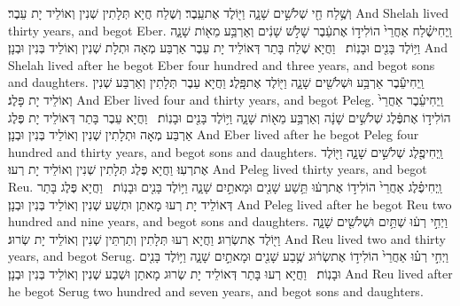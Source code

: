 {וְשֶׁ֥לַח חַ֖י שְׁלֹשִׁ֣ים שָׁנָ֑ה וַיּ֖וֹלֶד אֶת\maqqaf עֵֽבֶר׃}
{וְשֶׁלַח חֲיָא תְּלָתִין שְׁנִין וְאוֹלֵיד יָת עֵבֶר׃}
{And Shelah lived thirty years, and begot Eber.}{}
{וַֽיְחִי\maqqaf שֶׁ֗לַח אַחֲרֵי֙ הוֹלִיד֣וֹ אֶת\maqqaf עֵ֔בֶר שָׁלֹ֣שׁ שָׁנִ֔ים וְאַרְבַּ֥ע מֵא֖וֹת שָׁנָ֑ה וַיּ֥וֹלֶד בָּנִ֖ים וּבָנֽוֹת׃ \setuma }
{וַחֲיָא שֶׁלַח בָּתַר דְּאוֹלֵיד יָת עֵבֶר אַרְבַּע מְאָה וּתְלָת שְׁנִין וְאוֹלֵיד בְּנִין וּבְנָן׃}
{And Shelah lived after he begot Eber four hundred and three years, and begot sons and daughters.}{}
{וַֽיְחִי\maqqaf עֵ֕בֶר אַרְבַּ֥ע וּשְׁלֹשִׁ֖ים שָׁנָ֑ה וַיּ֖וֹלֶד אֶת\maqqaf פָּֽלֶג׃}
{וַחֲיָא עֵבֶר תְּלָתִין וְאַרְבַּע שְׁנִין וְאוֹלֵיד יָת פָּלֶג׃}
{And Eber lived four and thirty years, and begot Peleg.}{}
{וַֽיְחִי\maqqaf עֵ֗בֶר אַחֲרֵי֙ הוֹלִיד֣וֹ אֶת\maqqaf פֶּ֔לֶג שְׁלֹשִׁ֣ים שָׁנָ֔ה וְאַרְבַּ֥ע מֵא֖וֹת שָׁנָ֑ה וַיּ֥וֹלֶד בָּנִ֖ים וּבָנֽוֹת׃ \setuma }
{וַחֲיָא עֵבֶר בָּתַר דְּאוֹלֵיד יָת פֶּלֶג אַרְבַּע מְאָה וּתְלָתִין שְׁנִין וְאוֹלֵיד בְּנִין וּבְנָן׃}
{And Eber lived after he begot Peleg four hundred and thirty years, and begot sons and daughters.}{}
{וַֽיְחִי\maqqaf פֶ֖לֶג שְׁלֹשִׁ֣ים שָׁנָ֑ה וַיּ֖וֹלֶד אֶת\maqqaf רְעֽוּ׃}
{וַחֲיָא פֶּלֶג תְּלָתִין שְׁנִין וְאוֹלֵיד יָת רְעוּ׃}
{And Peleg lived thirty years, and begot Reu.}{}
{וַֽיְחִי\maqqaf פֶ֗לֶג אַחֲרֵי֙ הוֹלִיד֣וֹ אֶת\maqqaf רְע֔וּ תֵּ֥שַׁע שָׁנִ֖ים וּמָאתַ֣יִם שָׁנָ֑ה וַיּ֥וֹלֶד בָּנִ֖ים וּבָנֽוֹת׃ \setuma }
{וַחֲיָא פֶּלֶג בָּתַר דְּאוֹלֵיד יָת רְעוּ מָאתַן וּתְשַׁע שְׁנִין וְאוֹלֵיד בְּנִין וּבְנָן׃}
{And Peleg lived after he begot Reu two hundred and nine years, and begot sons and daughters.}{}
{וַיְחִ֣י רְע֔וּ שְׁתַּ֥יִם וּשְׁלֹשִׁ֖ים שָׁנָ֑ה וַיּ֖וֹלֶד אֶת\maqqaf שְׂרֽוּג׃}
{וַחֲיָא רְעוּ תְּלָתִין וְתַרְתֵּין שְׁנִין וְאוֹלֵיד יָת שְׂרוּג׃}
{And Reu lived two and thirty years, and begot Serug.}{}
{וַיְחִ֣י רְע֗וּ אַחֲרֵי֙ הוֹלִיד֣וֹ אֶת\maqqaf שְׂר֔וּג שֶׁ֥בַע שָׁנִ֖ים וּמָאתַ֣יִם שָׁנָ֑ה וַיּ֥וֹלֶד בָּנִ֖ים וּבָנֽוֹת׃ \setuma }
{וַחֲיָא רְעוּ בָּתַר דְּאוֹלֵיד יָת שְׂרוּג מָאתַן וּשְׁבַע שְׁנִין וְאוֹלֵיד בְּנִין וּבְנָן׃}
{And Reu lived after he begot Serug two hundred and seven years, and begot sons and daughters.}{}
